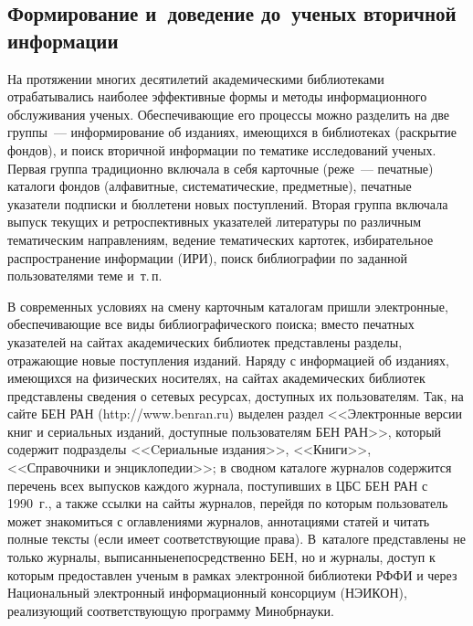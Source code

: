\begin{multicols}{2}
\section{Формирование и~доведение до~ученых вторичной информации}

 
   На протяжении многих десятилетий академическими библиотеками отрабатывались 
наиболее эффективные формы и методы информационного обслуживания ученых. 
Обеспечивающие его процессы можно разделить на две группы~--- информирование об 
изданиях, имеющихся в библиотеках (раскрытие фондов), и поиск вторичной информации 
по тематике исследований ученых. Первая группа традиционно включала в себя 
карточные (реже~--- печатные) каталоги фондов (алфавитные,\linebreak
 сис\-те\-ма\-ти\-че\-ские, предметные), 
печатные указатели подписки и бюллетени новых поступлений. Вторая группа включала 
выпуск текущих и ретро\-спективных указателей литературы по различным тематическим 
направлениям, ведение темати\-че\-ских картотек, избирательное распространение 
информации (ИРИ), поиск библиографии по заданной пользователями теме и~т.\,п. 
   
   В современных условиях на смену карточным каталогам пришли электронные, 
обеспечивающие все виды библиографического поиска; вместо печатных указателей на 
сайтах академических биб\-лио\-тек представлены разделы, отражающие новые поступления 
изданий. Наряду с информацией об изданиях, имеющихся на физических носителях, на 
сайтах академических библиотек представлены сведения о сетевых ресурсах, доступных 
их пользователям. Так, на сайте БЕН РАН ({\sf http://www.benran.ru}) выделен раздел 
<<Электронные версии книг и сериальных изданий, доступные пользователям БЕН 
РАН>>, который содержит подразделы <<Cериальные издания>>, <<Книги>>, 
<<Справочники и энциклопедии>>; в сводном каталоге журналов содержится перечень 
всех выпусков каждого журнала, поступивших в ЦБС БЕН РАН с 1990~г., а также ссылки 
на сайты журналов, перейдя по которым пользователь может знакомиться с оглавлениями 
журналов, аннотациями статей и читать полные тексты (если имеет соответствующие 
права). В~каталоге пред\-став\-ле\-ны не только журналы, выписанные\linebreak непосредственно БЕН, 
но и журналы, доступ к которым предоставлен ученым в рамках электронной библиотеки 
РФФИ и через Национальный электронный информационный
консорциум (\mbox{НЭИКОН}), реализующий соответствующую программу Минобрнауки. 
   

\end{multicols}
